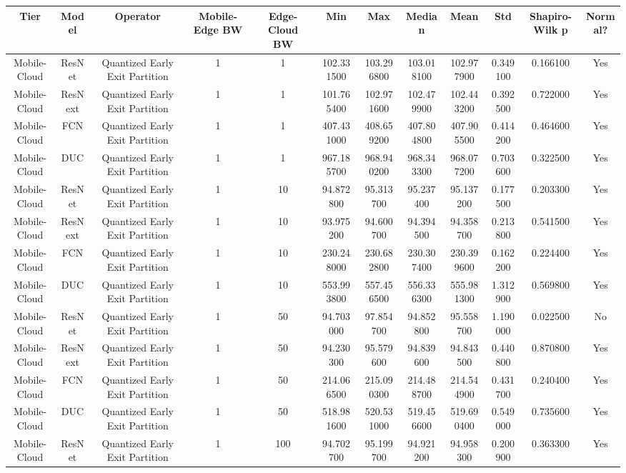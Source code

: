 \begin{tabular}{|c||c||c||c||c||c||c||c||c||c||c||c|}
\toprule
Tier & Model & Operator & Mobile-Edge BW & Edge-Cloud BW & Min & Max & Median & Mean & Std & Shapiro-Wilk p & Normal? \\
\midrule
Mobile-Cloud & ResNet & Quantized Early Exit Partition & 1 & 1 & 102.331500 & 103.296800 & 103.018100 & 102.977900 & 0.349100 & 0.166100 & Yes \\
Mobile-Cloud & ResNext & Quantized Early Exit Partition & 1 & 1 & 101.765400 & 102.971600 & 102.479900 & 102.443200 & 0.392500 & 0.722000 & Yes \\
Mobile-Cloud & FCN & Quantized Early Exit Partition & 1 & 1 & 407.431000 & 408.659200 & 407.804800 & 407.905500 & 0.414200 & 0.464600 & Yes \\
Mobile-Cloud & DUC & Quantized Early Exit Partition & 1 & 1 & 967.185700 & 968.940200 & 968.343300 & 968.077200 & 0.703600 & 0.322500 & Yes \\
Mobile-Cloud & ResNet & Quantized Early Exit Partition & 1 & 10 & 94.872800 & 95.313700 & 95.237400 & 95.137200 & 0.177500 & 0.203300 & Yes \\
Mobile-Cloud & ResNext & Quantized Early Exit Partition & 1 & 10 & 93.975200 & 94.600700 & 94.394500 & 94.358700 & 0.213800 & 0.541500 & Yes \\
Mobile-Cloud & FCN & Quantized Early Exit Partition & 1 & 10 & 230.248000 & 230.682800 & 230.307400 & 230.399600 & 0.162200 & 0.224400 & Yes \\
Mobile-Cloud & DUC & Quantized Early Exit Partition & 1 & 10 & 553.993800 & 557.456500 & 556.336300 & 555.981300 & 1.312900 & 0.569800 & Yes \\
Mobile-Cloud & ResNet & Quantized Early Exit Partition & 1 & 50 & 94.703000 & 97.854700 & 94.852800 & 95.558700 & 1.190000 & 0.022500 & No \\
Mobile-Cloud & ResNext & Quantized Early Exit Partition & 1 & 50 & 94.230300 & 95.579600 & 94.839600 & 94.843500 & 0.440800 & 0.870800 & Yes \\
Mobile-Cloud & FCN & Quantized Early Exit Partition & 1 & 50 & 214.066500 & 215.090300 & 214.488700 & 214.544900 & 0.431700 & 0.240400 & Yes \\
Mobile-Cloud & DUC & Quantized Early Exit Partition & 1 & 50 & 518.981600 & 520.531000 & 519.456600 & 519.690400 & 0.549000 & 0.735600 & Yes \\
Mobile-Cloud & ResNet & Quantized Early Exit Partition & 1 & 100 & 94.702700 & 95.199700 & 94.921200 & 94.958300 & 0.200900 & 0.363300 & Yes \\

\end{tabular}
